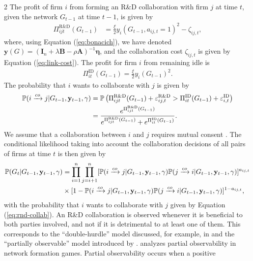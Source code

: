 \documentclass[12pt]{article}
\begin{document}
\begin{spacing}{2}
The profit of firm $i$ from forming an R\&D collaboration with firm $j$ at time $t$, given the network $G_{t-1}$ at time $t-1$, is given by
\begin{align*}
\Pi_{ijt}^{\text{R\&D}}(G_{t-1}) & = \frac{\xi}{2} y_i(G_{t-1},a_{ij,t}=1)^2 - \zeta_{ij,t},
\end{align*}
where, using Equation (\ref{eq:bonacich}), we have denoted $\mathbf{y}(G) = (\mathbf{I}_n + \lambda \mathbf{B} - \rho \mathbf{A})^{-1} \bm{\eta}$, and the collaboration cost $\zeta_{ij,t}$ is given by Equation (\ref{eq:link-cost}). The profit for firm $i$ from remaining idle is 
\begin{align*}
\Pi_{it}^{\text{ID}}(G_{t-1})  =  \frac{\xi}{2} y_i(G_{t-1})^2.
\end{align*}
The probability that $i$ wants to collaborate with $j$ is given by
\begin{align}
\mathbb{P}(i \xrightarrow{co} j|G_{t-1},\mathbf{y}_{t-1},\gamma)
& =
\mathbb{P}\left(
\Pi_{ijt}^{\text{R\&D}}(G_{t-1}) +
\varepsilon^{\text{R\&D}}_{ij,t}
> 
\Pi_{it}^{\text{ID}}(G_{t-1}) +
\varepsilon^{\text{ID}}_{i,t}
\right)   \notag \\
& =
\frac{e^{\Pi_{ijt}^{\text{R\&D}}(G_{t-1})}}{e^{\Pi_{ijt}^{\text{R\&D}}(G_{t-1})}
+
e^{\Pi_{it}^{\text{ID}}(G_{t-1})}
}.
\label{eq:rnd-collab}
\end{align}
We assume that a collaboration between $i$ and $j$ requires mutual consent \citep[cf. e.g.][]{hanaki10:_dynam_of_r_d_networ}. The conditional likelihood taking into account the collaboration decisions of all pairs of firms at time $t$ is then given by
\begin{align}
\mathbb{P}(G_t | G_{t-1},\mathbf{y}_{t-1},\gamma) 
& = 
\prod_{i=1}^n \prod_{j=i+1}^n 
[
\mathbb{P}(i \xrightarrow{co} j|G_{t-1},\mathbf{y}_{t-1},\gamma)
\mathbb{P}(j \xrightarrow{co} i|G_{t-1},\mathbf{y}_{t-1},\gamma)
]^{a_{ij,t}} \notag \\
& \times
[1-\mathbb{P}(i \xrightarrow{co} j|G_{t-1},\mathbf{y}_{t-1},\gamma)
\mathbb{P}(j \xrightarrow{co} i|G_{t-1},\mathbf{y}_{t-1},\gamma)
]^{1-a_{ij,t}},
\label{eq:logistic-rnd}
\end{align}
with the probability that $i$ wants to collaborate with $j$ given by Equation (\ref{eq:rnd-collab}). An R\&D collaboration is observed whenever it is beneficial to both parties involved, and not if it is detrimental to at least one of them. This corresponds to the ``double-hurdle'' model discussed, for example, in \citet{Paula2020} and the ``partially observable'' model introduced by \citet{Poirier1980}. \citet{Comola2012} analyzes partial observability in network formation games. Partial observability occurs when a positive

\end{spacing}
\end{document}
